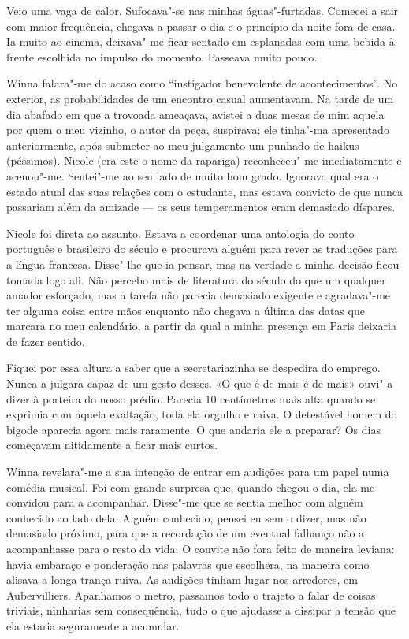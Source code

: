 Veio uma vaga de calor. Sufocava"-se nas minhas águas"-furtadas. Comecei a sair com maior frequência, chegava a passar o dia e
o princípio da noite fora de casa. Ia muito ao cinema, deixava"-me ficar
sentado em esplanadas com uma bebida à frente escolhida no impulso do
momento. Passeava muito pouco.

Winna falara"-me do acaso como ``instigador benevolente de
acontecimentos''. No exterior, as probabilidades de um encontro casual
aumentavam. Na tarde de um dia abafado em que a trovoada ameaçava,
avistei a duas mesas de mim
aquela por quem o meu vizinho, o autor da peça, suspirava; ele tinha"-ma
apresentado anteriormente, após submeter ao meu julgamento um punhado de
haikus (péssimos). Nicole (era este o nome da rapariga) reconheceu"-me
imediatamente e acenou"-me. Sentei"-me ao seu lado de muito bom grado.
Ignorava qual era o estado atual das suas relações com o estudante, mas
estava convicto de que nunca passariam além da amizade
--- os seus temperamentos eram demasiado díspares.

Nicole foi direta ao assunto. Estava a coordenar uma antologia do conto
português e brasileiro do século  e procurava alguém para rever as
traduções para a língua francesa. Disse"-lhe que ia pensar, mas na
verdade a minha decisão ficou tomada logo ali. Não percebo mais de
literatura do século  do que um qualquer amador esforçado, mas a
tarefa não parecia demasiado exigente e agradava"-me ter alguma coisa
entre mãos enquanto não chegava a última das datas que marcara no meu
calendário, a partir da qual a minha presença em Paris deixaria de fazer
sentido.

Fiquei por essa altura a saber que a secretariazinha se despedira do
emprego. Nunca a julgara capaz de um gesto desses.
«O que é de mais é de mais» ouvi"-a dizer à porteira do nosso prédio.
Parecia 10 centímetros mais alta quando se exprimia com aquela
exaltação, toda ela orgulho e raiva. O detestável homem do bigode
aparecia agora mais raramente. O que andaria ele a preparar? Os dias
começavam nitidamente a ficar mais curtos.

Winna revelara"-me a sua intenção de entrar em audições para um papel
numa comédia musical. Foi com grande surpresa que, quando chegou o
dia, ela me convidou para a acompanhar. Disse"-me que se sentia melhor
com alguém conhecido ao lado dela. Alguém conhecido, pensei eu sem
o dizer, mas não demasiado próximo, para que a recordação de um eventual
falhanço não a acompanhasse para o resto da vida. O convite não fora
feito de maneira leviana: havia embaraço e ponderação nas palavras que
escolhera, na maneira como alisava a longa trança ruiva. As audições
tinham lugar nos arredores, em Aubervilliers. Apanhamos o metro,
passamos todo o trajeto a falar de coisas triviais, ninharias sem
consequência, tudo o que ajudasse a dissipar a tensão que ela estaria
seguramente a acumular.


